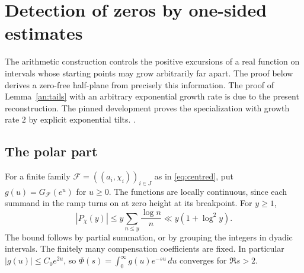 \section{Detection of zeros by one-sided estimates}\label{an:section}

The arithmetic construction controls the positive excursions of a real function on intervals whose starting points may grow arbitrarily far apart. The proof below derives a zero-free half-plane from precisely this information. The proof of Lemma~\ref{an:tails} with an arbitrary exponential growth rate is due to the present reconstruction. The pinned development proves the specialization with growth rate \(2\) by explicit exponential tilts. .

\subsection{The polar part}
For a finite family \(\mathcal F=((a_i,\chi_i))_{i\in J}\) as in \eqref{eq:centred}, put \(g(u)=G_{\mathcal F}(e^u)\) for \(u\ge0\). The functions are locally continuous, since each summand in the ramp turns on at zero height at its breakpoint. For \(y\ge1\),
\[
 |P_\chi(y)|\le y\sum_{n\le y}\frac{\log n}{n}
 \ll y(1+\log^2 y).
\]
The bound follows by partial summation, or by grouping the integers in dyadic intervals. The finitely many compensation coefficients are fixed. In particular \(|g(u)|\le C_0e^{2u}\), so \(\Phi(s)=\int_0^\infty g(u)e^{-su}\,du\) converges for \(\Re s>2\).

